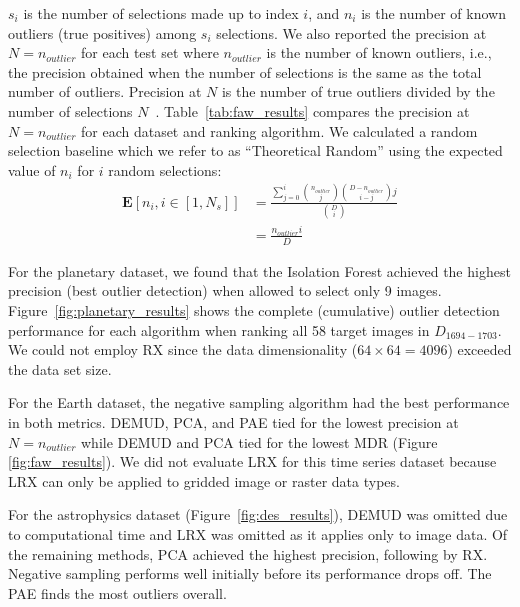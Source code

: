 \documentclass[letterpaper]{article} %
\newcommand{\todo}[1]{\textcolor{blue}{#1}}
\begin{document}
 $s_i$ is the number of selections made up to index $i$,
 and $n_i$ is the number of known outliers (true positives)
among $s_i$ selections.
We also reported the precision at $N=n_{outlier}$ for each test set where
$n_{outlier}$ is the number of known outliers, i.e.,  the precision obtained 
when the number of selections is the same as the total number of outliers. 
Precision at $N$ is the number of true outliers divided by the number of 
selections $N$~\citep{campos2016evaluation}.
Table~\ref{tab:faw_results} compares the precision at $N=n_{outlier}$ for
each dataset and ranking algorithm. 
We calculated a random selection baseline which we refer to as ``Theoretical
Random'' using the expected value of $n_i$ for $i$ random selections:
\begin{align}
\mathbf{E}[n_i, i \in[1, N_s]] &= \frac{\sum^i_{j=0} {n_{outlier}\choose j} {D-n_{outlier}\choose i-j} j}{{D\choose i}} \\
&= \frac{n_{outlier}i}{D}
\end{align}

%

For the planetary dataset, we found that
the Isolation Forest achieved the highest precision (best outlier
detection) when allowed to select only \num{9} images.
Figure~\ref{fig:planetary_results} shows the complete (cumulative)
outlier detection performance for each algorithm when ranking
all \num{58} target images in $D_{1694-1703}$. We could not
employ RX since the data dimensionality ($64 \times 64 =
4096$) exceeded the data set size. 

For the Earth dataset, the negative sampling algorithm had the best performance
in both metrics. DEMUD, PCA, and PAE tied for the lowest precision at 
$N=n_{outlier}$ while DEMUD and PCA tied for the lowest
MDR (Figure \ref{fig:faw_results}). We did not evaluate LRX for this time 
series dataset because LRX can only be applied to gridded image or raster 
data types.

For the astrophysics dataset (Figure~\ref{fig:des_results}), DEMUD was omitted due to computational time 
and LRX was omitted as it applies only to image data.  Of the remaining methods, 
PCA achieved the highest precision, following by RX.  Negative sampling 
performs well initially before its performance drops off.  The PAE finds the most outliers 
overall.  
\end{document}
